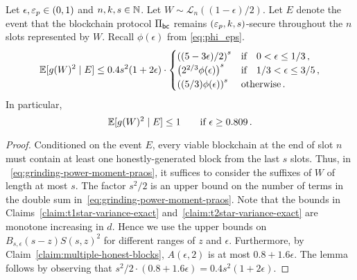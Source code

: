 \begin{lemma}\label{lemma:grinding-praos-second-moment}
  Let $\epsilon, \mathsf{\varepsilon}_p \in (0, 1)$ and $n, k, s \in \mathbb{N}$. 
  Let $W \sim \mathcal{L}_n((1 - \epsilon)/2)$. 
  Let $E$ denote the event that 
  the blockchain protocol $\Pi_\mathsf{bc}$ 
  remains $(\mathsf{\varepsilon}_p, k, s)$-secure throughout 
  the $n$ slots represented by $W$. 
  Recall $\phi(\epsilon)$ from \eqref{eq:phi_eps}.  
  \begin{equation}\label{eq:grinding-praos-second-moment}
    \operatorname{\mathbb{E}}[ g(W)^2 \mid E] 
    \leq 
      0.4 s^2 (1 + 2\epsilon)
      \cdot \begin{cases}
      \left( (5-3 \epsilon)/2 \right)^s & \text{if}\quad 0 < \epsilon \leq 1/3\,, \\
      \left( 2^{2/3} \phi(\epsilon) \right)^s & \text{if}\quad 1/3 < \epsilon \leq 3/5\,, \\
      \left( (5/3) \phi(\epsilon) \right)^s & \text{otherwise}\,. 
    \end{cases}    
  \end{equation}
  In particular, 
  $$
    \operatorname{\mathbb{E}} [g(W)^2 \mid E] \leq 1
    \qquad \text{if $\epsilon \geq 0.809$}\,.
  $$
\end{lemma}
\begin{proof}
  Conditioned on the event $E$, 
  every viable blockchain at the end of slot $n$ 
  must contain at least one honestly-generated block from the last $s$ slots. 
  Thus, 
  in ~\eqref{eq:grinding-power-moment-praos}, 
  it suffices to consider the suffixes of $W$ of length at most $s$. 
  The factor $s^2/2$ is an upper bound on 
  the number of terms in the double sum in~\eqref{eq:grinding-power-moment-praos}. 
  Note that the bounds in 
  Claims~\ref{claim:t1star-variance-exact} 
  and~\ref{claim:t2star-variance-exact} are monotone increasing in $d$. 
  Hence we use the upper bounds on $B_{s, \epsilon}(s-z) S(s,z)^2$ for 
  different ranges of $z$ and $\epsilon$. 
  Furthermore, by Claim~\ref{claim:multiple-honest-blocks}, 
  $A(\epsilon, 2)$ is at most $0.8 + 1.6 \epsilon$. 
  The lemma follows by observing that $s^2/2 \cdot (0.8 + 1.6 \epsilon) = 0.4 s^2 (1 + 2 \epsilon)$.
\end{proof}




